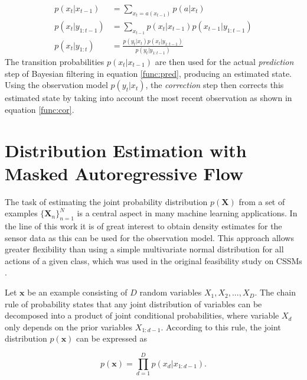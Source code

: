 \documentclass[11pt,titlepage,oneside,openany]{book}
\begin{document}
\begin{align}
	p(x_t|x_{t-1}) &= \sum_{x_t = a(x_{t-1})}^{} p(a|x_t) \label{func:traprob} \\
	p(x_t|y_{1:t-1}) &= \sum_{x_{t-1}} p(x_t|x_{t-1}) p(x_{t-1}|y_{1:t-1}) \label{func:pred} \\
	p(x_t|y_{1:t}) &= \frac{p(y_t|x_t) p(x_t|y_{1:t-1})}{p(y_t|y_{1:t-1})} \label{func:cor}
\end{align}
The transition probabilities $p(x_t|x_{t-1})$ are then used for the actual \emph{prediction} step of Bayesian filtering in equation \ref{func:pred}, producing an estimated state. Using the observation model $p(y_t|x_t)$, the \emph{correction} step then corrects this estimated state by taking into account the most recent observation as shown in equation \ref{func:cor}.

\section{Distribution Estimation with Masked Autoregressive Flow}
\label{sec:maf}
The task of estimating the joint probability distribution $p(\pmb{X})$ from a set of examples $\{\pmb{X}_n\}^N_{n=1}$ is a central aspect in many machine learning applications. In the line of this work it is of great interest to obtain density estimates for the sensor data as this can be used for the observation model. This approach allows greater flexibility than using a simple multivariate normal distribution for all actions of a given class, which was used in the original feasibility study on CSSMs \cite{kruger_computational_2014}.

Let $\pmb{x}$ be an example consisting of $D$ random variables $X_1, X_2,...,X_D$. The chain rule of probability states that any joint distribution of variables can be decomposed into a product of joint conditional probabilities, where variable $X_d$ only depends on the prior variables $X_{1:d-1}$. According to this rule, the joint distribution $p(\pmb{x})$ can be expressed as

\begin{equation}
	\label{func:chain}
	p(\pmb{x}) = \prod_{d=1}^{D} p(x_d|x_{1:d-1}).
\end{equation}
\end{document}
